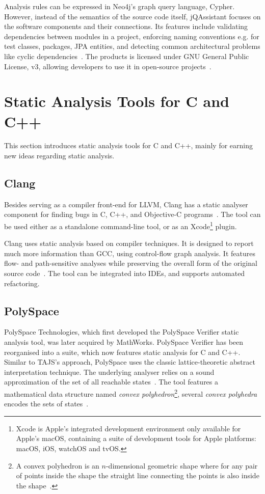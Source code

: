Analysis rules can be expressed in Neo4j's graph query language, Cypher. However, instead of the semantics of the source code itself, jQAssistant focuses on the software components and their connections. Its features include validating dependencies between modules in a project, enforcing naming conventions e.g. for test classes, packages, JPA entities, and detecting common architectural problems like cyclic dependencies~\cite{jqassistant-documentation}. The products is licensed under GNU General Public License, v3, allowing developers to use it in open-source projects~\cite{gplv3}.


\section{Static Analysis Tools for C and C++}

This section introduces static analysis tools for C and C++, mainly for earning new ideas regarding static analysis.


\subsection{Clang}

Besides serving as a compiler front-end for LLVM, Clang has a static analyser component for finding bugs in C, C++, and Objective-C programs~\cite{clang-analyser-website}. The tool can be used either as a standalone command-line tool, or as an Xcode\footnote{Xcode is Apple's integrated development environment only available for Apple's macOS, containing a suite of development tools for Apple platforms: macOS, iOS, watchOS and tvOS.} plugin.

Clang uses static analysis based on compiler techniques. It is designed to report much more information than GCC, using control-flow graph analysis. It features flow- and path-sensitive analyses while preserving the overall form of the original source code~\cite{kremenek2008finding}. The tool can be integrated into IDEs, and supports automated refactoring.


\subsection{PolySpace}

PolySpace Technologies, which first developed the PolySpace Verifier static analysis tool, was later acquired by MathWorks. PolySpace Verifier has been reorganised into a suite, which now features static analysis for C and C++. Similar to TAJS's approach, PolySpace uses the classic lattice-theoretic abstract interpretation technique. The underlying analyser relies on a sound approximation of the set of all reachable states~\cite{emanuelsson2008comparative}. The tool features a mathematical data structure named \emph{convex polyhedron}\footnote{A convex polyhedron is an $n$-dimensional geometric shape where for any pair of points inside the shape the straight line connecting the points is also inside the shape~\cite{emanuelsson2008comparative}.}, several \emph{convex polyhedra} encodes the sets of states~\cite{cousot1978automatic}.

